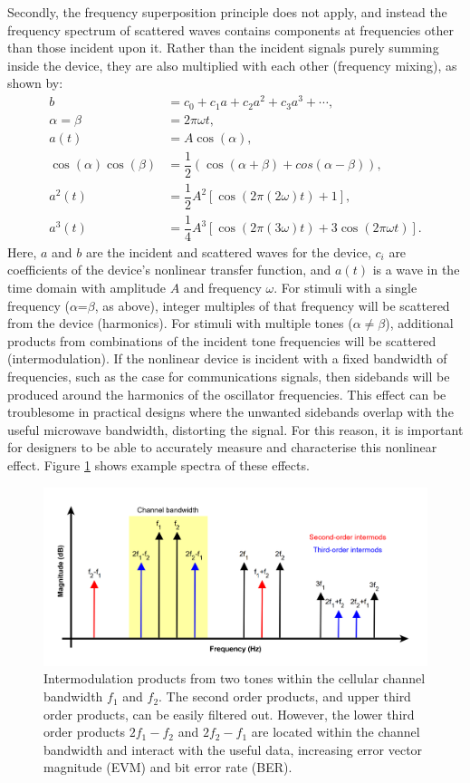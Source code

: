 \documentclass[../thesis/thesis.tex]{subfiles}
\begin{document}
Secondly, the frequency superposition principle does not apply, and instead the frequency spectrum of scattered waves contains components at frequencies other than those incident upon it. Rather than the incident signals purely summing inside the device, they are also multiplied with each other (frequency mixing), as shown by:
\begin{align}
b&=c_0+c_1a+c_2a^2+c_3a^3+\cdots,\\
\alpha=\beta&=2\pi\omega t,\\
a(t)&=A\cos(\alpha),\\
\cos(\alpha)\cos(\beta)&=\dfrac{1}{2}(\cos(\alpha+\beta)+cos(\alpha-\beta)),\\
a^2(t)&=\dfrac{1}{2}A^2[\cos(2\pi(2\omega)t)+1],\\
a^3(t)&=\dfrac{1}{4}A^3[\cos(2\pi(3\omega)t)+3\cos(2\pi\omega t)].
\end{align}
Here, $a$ and $b$ are the incident and scattered waves for the device, $c_i$ are coefficients of the device's nonlinear transfer function, and $a(t)$ is a wave in the time domain with amplitude $A$ and frequency $\omega$. For stimuli with a single frequency ($\alpha$=$\beta$, as above), integer multiples of that frequency will be scattered from the device (harmonics). For stimuli with multiple tones ($\alpha\ne\beta$), additional products from combinations of the incident tone frequencies will be scattered (intermodulation). If the nonlinear device is incident with a fixed bandwidth of frequencies, such as the case for communications signals, then sidebands will be produced around the harmonics of the oscillator frequencies. This effect can be troublesome in practical designs where the unwanted sidebands overlap with the useful microwave bandwidth, distorting the signal. For this reason, it is important for designers to be able to accurately measure and characterise this nonlinear effect. Figure \ref{ch2_fig_im3} shows example spectra of these effects.

\begin{figure}
	\centering
	\includegraphics[width=\textwidth]{im3}
	\caption[Intermodulation products from two interacting tones.]{Intermodulation products from two tones within the cellular channel bandwidth $f_1$ and $f_2$. The second order products, and upper third order products, can be easily filtered out. However, the lower third order products $2f_1-f_2$ and $2f_2-f_1$ are located within the channel bandwidth and interact with the useful data, increasing error vector magnitude (EVM) and bit error rate (BER).}
	\label{ch2_fig_im3}
\end{figure}
\end{document}
